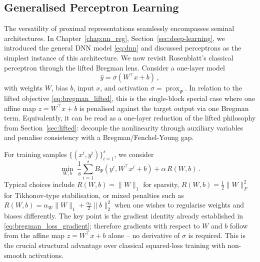 \subsection{Generalised Perceptron Learning}
The versatility of proximal representations seamlessly encompasses seminal architectures. In Chapter~\ref{chap:nn_reg}, Section~\ref{sec:deep-learning}, we introduced the general DNN model \eqref{eq:dnn} and discussed perceptrons as the simplest instance of this architecture. We now revisit Rosenblatt's classical perceptron \cite{rosenblatt1957, rosenblatt1958} through the lifted Bregman lens. Consider a one-layer model
\begin{equation}\label{eq:perceptron_model}
    \hat y = \sigma\left(W^\top x + b\right) \, ,
\end{equation}
with weights $W$, bias $b$, input $x$, and activation $\sigma = \operatorname{prox}_{\Psi}$. In relation to the lifted objective \eqref{eq:bregman_lifted}, this is the single-block special case where one affine map $z = W^\top x + b$ is penalised against the target output via one Bregman term. Equivalently, it can be read as a one-layer reduction of the lifted philosophy from Section~\ref{sec:lifted}: decouple the nonlinearity through auxiliary variables and penalise consistency with a Bregman/Fenchel-Young gap.

\noindent For training samples $\{(x^i,y^i)\}_{i=1}^s$, we consider
\begin{equation}\label{eq:perceptron_bregman_objective}
    \min_{W,b}\; \frac{1}{s}\sum_{i=1}^s B_{\Psi}\!\left(y^i, W^\top x^i + b\right) + \alpha\,R(W,b) \, .
\end{equation}
Typical choices include $R(W,b)=\|W\|_1$ for sparsity, $R(W,b)=\frac12\|W\|_F^2$ for Tikhonov-type stabilisation, or mixed penalties such as $R(W,b)=\alpha_W\|W\|_1+\frac{\alpha_b}{2}\|b\|_2^2$ when one wishes to regularise weights and biases differently.
The key point is the gradient identity already established in \eqref{eq:bregman_loss_gradient}; therefore gradients with respect to $W$ and $b$ follow from the affine map $z = W^\top x + b$ alone -- no derivative of $\sigma$ is required. This is the crucial structural advantage over classical squared-loss training with non-smooth activations.

